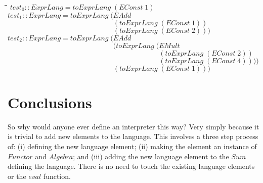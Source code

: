 \documentclass[11pt]{article}
\newlength{\lwidth}\setlength{\lwidth}{4.5cm}
\newlength{\cwidth}\setlength{\cwidth}{8mm} %
\newcommand{\Conid}[1]{\mathit{#1}}
\newcommand{\Varid}[1]{\mathit{#1}}
\begin{document}
\begin{tabbing}
\qquad\=\hspace{\lwidth}\=\hspace{\cwidth}\=\+\kill
${\Varid{test}_{0}\mathbin{::}\Conid{ExprLang}\mathrel{=}\Varid{toExprLang}\;(\Conid{EConst}\;\mathrm{1})}$\\
${\Varid{test}_{1}\mathbin{::}\Conid{ExprLang}\mathrel{=}\Varid{toExprLang}\;(\Conid{EAdd}}$\\
${\phantom{\Varid{test}_{1}\mathbin{::}\Conid{ExprLang}\mathrel{=}\Varid{toExprLang}\;(\mbox{}}(\Varid{toExprLang}\;(\Conid{EConst}\;\mathrm{1}))}$\\
${\phantom{\Varid{test}_{1}\mathbin{::}\Conid{ExprLang}\mathrel{=}\Varid{toExprLang}\;(\mbox{}}(\Varid{toExprLang}\;(\Conid{EConst}\;\mathrm{2})))}$\\
${\Varid{test}_{2}\mathbin{::}\Conid{ExprLang}\mathrel{=}\Varid{toExprLang}\;(\Conid{EAdd}}$\\
${\phantom{\Varid{test}_{2}\mathbin{::}\Conid{ExprLang}\mathrel{=}\Varid{toExprLang}\;(\mbox{}}(\Varid{toExprLang}\;(\Conid{EMult}}$\\
${\phantom{\Varid{test}_{2}\mathbin{::}\Conid{ExprLang}\mathrel{=}\Varid{toExprLang}\;(\mbox{}}\phantom{(\Varid{toExprLang}\;(\mbox{}}(\Varid{toExprLang}\;(\Conid{EConst}\;\mathrm{2}))}$\\
${\phantom{\Varid{test}_{2}\mathbin{::}\Conid{ExprLang}\mathrel{=}\Varid{toExprLang}\;(\mbox{}}\phantom{(\Varid{toExprLang}\;(\mbox{}}(\Varid{toExprLang}\;(\Conid{EConst}\;\mathrm{4}))))}$\\
${\phantom{\Varid{test}_{2}\mathbin{::}\Conid{ExprLang}\mathrel{=}\Varid{toExprLang}\;(\mbox{}}(\Varid{toExprLang}\;(\Conid{EConst}\;\mathrm{1})))}$
\end{tabbing}
\section{Conclusions}

So why would anyone ever define an interpreter this way?  Very simply
because it is trivial to add new elements to the language.  This
involves a three step process of: (i) defining the new language
element; (ii) making the element an instance of \ensuremath{\Conid{Functor}} and
\ensuremath{\Conid{Algebra}}; and (iii) adding the new language element to the \ensuremath{\Conid{Sum}}
defining the language. There is no need to touch the existing language
elements or the \ensuremath{\Varid{eval}} function.
\end{document}
